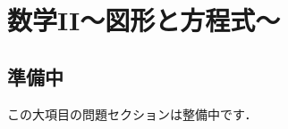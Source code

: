 \documentclass[../../ms_q.tex]{subfiles}
\begin{document}
\section{数学II～図形と方程式～}

\subsection*{準備中}
この大項目の問題セクションは整備中です．
\end{document}
